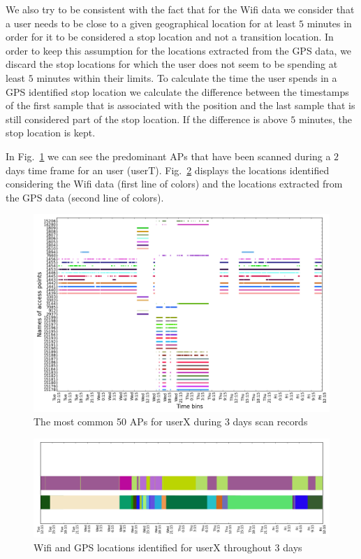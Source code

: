 We also try to be consistent with the fact that for the Wifi data we consider
that a user needs to be close to a given geographical location for at least $5$
minutes in order for it to be considered a stop location and not a transition
location. In order to keep this assumption for the locations extracted from the
GPS data, we discard the stop locations for which the user does not seem to be
spending at least $5$ minutes within their limits. To calculate the time the
user spends in a GPS identified stop location we calculate the difference
between the timestamps of the first sample that is associated with the position
and the last sample that is still considered part of the stop location. If the
difference is above $5$ minutes, the stop location is kept.

In Fig.~\ref{user6_aps_2days} we can see the predominant APs that have been
scanned during a $2$ days time frame for an user (userT).
Fig.~\ref{user6_hmm_2days} displays the locations identified considering the
Wifi data (first line of colors) and the locations extracted from
the GPS data (second line of colors).

\begin{figure}[!h]
\centering
\includegraphics[width=\textwidth]{figures/gps/user_6_sorted_3days_no_rssi_plot.png}
\caption{The most common 50 APs for userX during 3 days scan records}
\label{user6_aps_2days}
\end{figure}

\begin{figure}[!h]
\centering
\includegraphics[width=\textwidth]{figures/gps/user_6_hmm_and_gps.png}
\caption{Wifi and GPS locations identified for userX throughout 3 days}
\label{user6_hmm_2days}
\end{figure}

